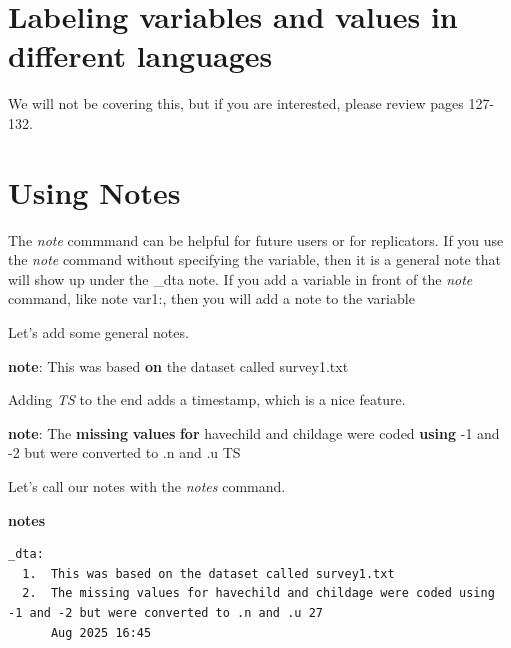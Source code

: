 \documentclass[
]{book}
\newenvironment{Shaded}{\begin{snugshade}}{\end{snugshade}}
\newcommand{\FunctionTok}[1]{\textcolor[rgb]{0.13,0.29,0.53}{\textbf{#1}}}
\newcommand{\KeywordTok}[1]{\textcolor[rgb]{0.13,0.29,0.53}{\textbf{#1}}}
\newcommand{\NormalTok}[1]{#1}
\begin{document}
\section{Labeling variables and values in different languages}\label{labeling-variables-and-values-in-different-languages}

We will not be covering this, but if you are interested, please review pages 127-132.

\section{Using Notes}\label{using-notes}

The \emph{note} commmand can be helpful for future users or for replicators. If you use the \emph{note} command without specifying the variable, then it is a general note that will show up under the \_dta note. If you add a variable in front of the \emph{note} command, like note var1:, then you will add a note to the variable

Let's add some general notes.

\begin{Shaded}
\begin{Highlighting}[]
\KeywordTok{note}\NormalTok{: This was based }\KeywordTok{on}\NormalTok{ the dataset called survey1.txt}
\end{Highlighting}
\end{Shaded}

Adding \emph{TS} to the end adds a timestamp, which is a nice feature.

\begin{Shaded}
\begin{Highlighting}[]
\KeywordTok{note}\NormalTok{: The }\FunctionTok{missing} \KeywordTok{values} \KeywordTok{for}\NormalTok{ havechild and childage were coded }\KeywordTok{using}\NormalTok{ {-}1 and {-}2 but were converted to .n and .u TS}
\end{Highlighting}
\end{Shaded}

Let's call our notes with the \emph{notes} command.

\begin{Shaded}
\begin{Highlighting}[]
\KeywordTok{notes}
\end{Highlighting}
\end{Shaded}

\begin{verbatim}
_dta:
  1.  This was based on the dataset called survey1.txt
  2.  The missing values for havechild and childage were coded using -1 and -2 but were converted to .n and .u 27
      Aug 2025 16:45
\end{verbatim}
\end{document}
